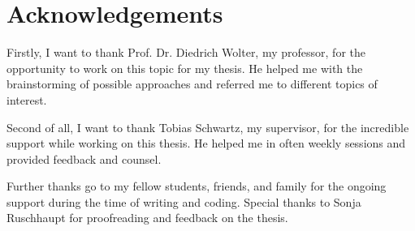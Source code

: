%
\section{Acknowledgements}\label{sec:acknowledgements}
%
Firstly, I want to thank Prof. Dr. Diedrich Wolter, my professor, for the opportunity to work on this topic for my thesis. He helped me with the brainstorming of possible approaches and referred me to different topics of interest.

Second of all, I want to thank Tobias Schwartz, my supervisor, for the incredible support while working on this thesis. He helped me in often weekly sessions and provided feedback and counsel.

Further thanks go to my fellow students, friends, and family for the ongoing support during the time of writing and coding. Special thanks to Sonja Ruschhaupt for proofreading and feedback on the thesis.
